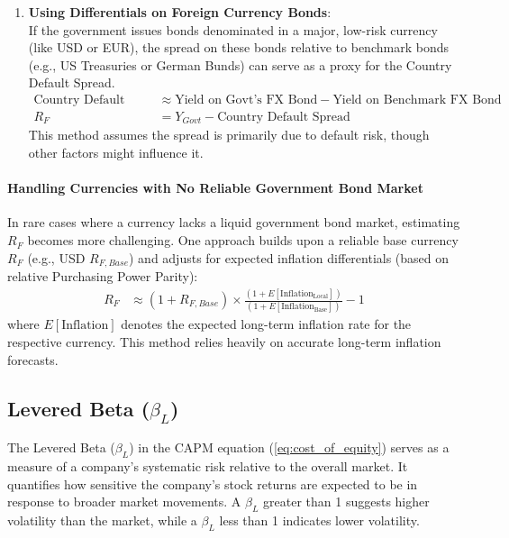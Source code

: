 \begin{enumerate}
    \item \textbf{Using Differentials on Foreign Currency Bonds}:\\
          If the government issues bonds denominated in a major, low-risk currency (like USD or EUR), the spread on these bonds relative to benchmark bonds (e.g., US Treasuries or German Bunds) can serve as a proxy for the Country Default Spread.
          \begin{align*}
              \text{Country Default Spread} & \approx \text{Yield on Govt's FX Bond} - \text{Yield on Benchmark FX Bond} \\[6pt]
              R_F                           & = Y_{Govt} - \text{Country Default Spread}
          \end{align*}
          This method assumes the spread is primarily due to default risk, though other factors might influence it.
\end{enumerate}

\paragraph{Handling Currencies with No Reliable Government Bond Market}
In rare cases where a currency lacks a liquid government bond market, estimating \(R_F\) becomes more challenging. One approach builds upon a reliable base currency \(R_F\) (e.g., USD \(R_{F, Base}\)) and adjusts for expected inflation differentials (based on relative Purchasing Power Parity):
\begin{align*}
    R_F & \approx (1 + R_{F, Base}) \times \frac{(1 + E[\text{Inflation}_{\text{Local}}])}{(1 + E[\text{Inflation}_{\text{Base}}])} - 1
\end{align*}
where \(E[\text{Inflation}]\) denotes the expected long-term inflation rate for the respective currency. This method relies heavily on accurate long-term inflation forecasts.


\subsection{Levered Beta (\(\beta_L\))} \label{sec:beta}
The Levered Beta (\(\beta_L\)) in the CAPM equation (\ref{eq:cost_of_equity}) serves as a measure of a company's systematic risk relative to the overall market. It quantifies how sensitive the company's stock returns are expected to be in response to broader market movements. A \(\beta_L\) greater than 1 suggests higher volatility than the market, while a \(\beta_L\) less than 1 indicates lower volatility.

